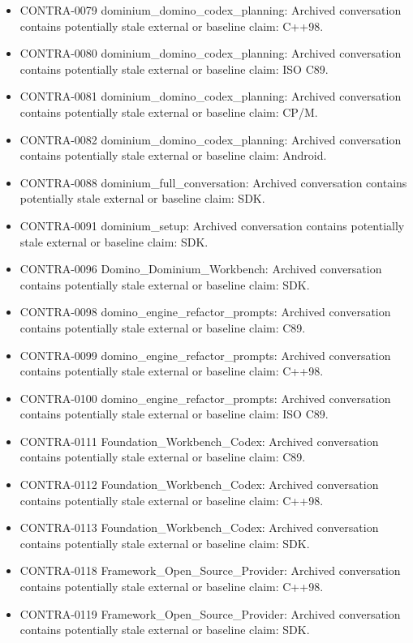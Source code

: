 \documentclass[11pt,a4paper]{report}
\begin{document}
\begin{itemize}
\item CONTRA-0079 dominium\_domino\_codex\_planning: Archived conversation contains potentially stale external or baseline claim: C++98.
\item CONTRA-0080 dominium\_domino\_codex\_planning: Archived conversation contains potentially stale external or baseline claim: ISO C89.
\item CONTRA-0081 dominium\_domino\_codex\_planning: Archived conversation contains potentially stale external or baseline claim: CP/M.
\item CONTRA-0082 dominium\_domino\_codex\_planning: Archived conversation contains potentially stale external or baseline claim: Android.
\item CONTRA-0088 dominium\_full\_conversation: Archived conversation contains potentially stale external or baseline claim: SDK.
\item CONTRA-0091 dominium\_setup: Archived conversation contains potentially stale external or baseline claim: SDK.
\item CONTRA-0096 Domino\_Dominium\_Workbench: Archived conversation contains potentially stale external or baseline claim: SDK.
\item CONTRA-0098 domino\_engine\_refactor\_prompts: Archived conversation contains potentially stale external or baseline claim: C89.
\item CONTRA-0099 domino\_engine\_refactor\_prompts: Archived conversation contains potentially stale external or baseline claim: C++98.
\item CONTRA-0100 domino\_engine\_refactor\_prompts: Archived conversation contains potentially stale external or baseline claim: ISO C89.
\item CONTRA-0111 Foundation\_Workbench\_Codex: Archived conversation contains potentially stale external or baseline claim: C89.
\item CONTRA-0112 Foundation\_Workbench\_Codex: Archived conversation contains potentially stale external or baseline claim: C++98.
\item CONTRA-0113 Foundation\_Workbench\_Codex: Archived conversation contains potentially stale external or baseline claim: SDK.
\item CONTRA-0118 Framework\_Open\_Source\_Provider: Archived conversation contains potentially stale external or baseline claim: C++98.
\item CONTRA-0119 Framework\_Open\_Source\_Provider: Archived conversation contains potentially stale external or baseline claim: SDK.

\end{itemize}
\end{document}
